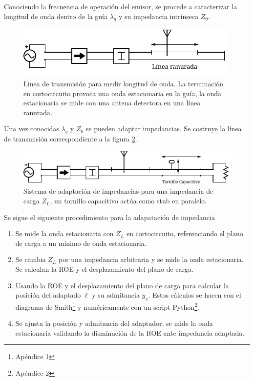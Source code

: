 \documentclass[11pt,a4paper]{article}
\begin{document}
\begin{multicols}{2}
Conociendo la frecuencia de operación del emisor, se procede a caracterizar la longitud de onda dentro de la guía $\lambda_g$ y su impedancia intrínseca $Z_0$. 
\begin{figure}[H]
    \centering
    \includegraphics[width=\linewidth]{Images/arreglo2.pdf}
    \caption{Linea de transmisión para medir longitud de onda. La terminación en cortocircuito provoca una onda estacionaria en la guía, la onda estacionaria se mide con una antena detectora en una línea ranurada.}
    \label{fig:arr2}
\end{figure}

Una vez conocidas $\lambda_g$ y $Z_0$ se pueden adaptar impedancias. Se costruye la línea de transmisión correspondiente a la figura \ref{fig:arr4}.

\begin{figure}[H]
    \centering
    \includegraphics[width=\linewidth]{Images/arreglo4.pdf}
    \caption{Sistema de adaptación de impedancias para una impedancia de carga $Z_L$, un tornillo capacitivo actúa como stub en paralelo.}
    \label{fig:arr4}
\end{figure}

Se sigue el siguiente procedimiento para la adapatación de impedancia

\begin{enumerate}
    \item Se mide la onda estacionaria con $Z_L$ en cortocircuito, referenciando el plano de carga a un mínimo de onda estacionaria.
    \item Se cambia $Z_L$ por una impedancia arbitraria y se mide la onda estacionaria. Se calculan la ROE y el desplazamiento del plano de carga.
    \item Usando la ROE y el desplazamiento del plano de carga para calcular la posición del adaptado $\ell$ y su admitancia $y_a$. 
    Estos cálculos se hacen con el diagrama de Smith\footnote{Apéndice 1} y numéricamente con un script Python\footnote{Apéndice 2}.
    \item Se ajusta la posición y admitancia del adaptador, se mide la onda estacionaria validando la disminución de la ROE ante impedancia adaptada.
\end{enumerate}


\end{multicols}
\end{document}
